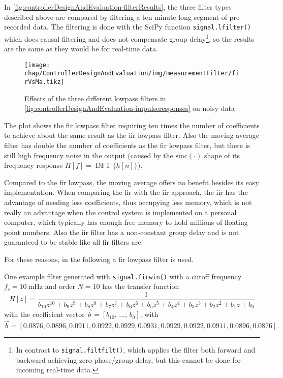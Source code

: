 In \autoref{fig:controllerDesignAndEvaluation-filterResults}, the three filter types described above are compared by filtering a ten minute long segment of pre-recorded data. The filtering is done with the SciPy function \texttt{signal.lfilter()} which does causal filtering and does not compensate group delay\footnote{In contrast to \texttt{signal.filtfilt()}, which applies the filter both forward and backward achieving zero phase/group delay, but this cannot be done for incoming real-time data.}, so the results are the same as they would be for real-time data.

\begin{figure}[tb]
	\centering
	\texttt{[image: chap/ControllerDesignAndEvaluation/img/measurementFilter/firVsMa.tikz]}
	\caption{Effects of the three different lowpass filters in \autoref{fig:controllerDesignAndEvaluation-impulseresponses} on noisy data}
	\label{fig:controllerDesignAndEvaluation-filterResults}
\end{figure}

The plot shows the \gls{fir} lowpass filter requiring ten times the number of coefficients to achieve about the same result as the \gls{iir} lowpass filter.
Also the moving average filter has double the number of coefficients as the \gls{fir} lowpass filter, but there is still high frequency noise in the output (caused by the $\text{sinc}(\cdot)$ shape of its frequency response $H[f]=\operatorname{DFT}\{h[n]\}$).

Compared to the \gls{fir} lowpass, the moving average offers no benefit besides its easy implementation.
When comparing the \gls{fir} with the \gls{iir} approach, the \gls{iir} has the advantage of needing less coefficients, thus occupying less memory, which is not really an advantage when the control system is implemented on a personal computer, which typically has enough free memory to hold millions of floating point numbers.
Also the \gls{iir} filter has a non-constant group delay and is not guaranteed to be stable like all \gls{fir} filters are.

For these reasons, in the following a \gls{fir} lowpass filter is used.

One example filter generated with \texttt{signal.firwin()} with a cutoff frequency $f_c=\SI{10}{\milli\hertz}$ and order $N=10$ has the transfer function
\begin{equation}
H[z]=\frac{1}{b_{10} z^{10} + b_{9} z^9 + b_{8} z^8 + b_{7} z^7 + b_{6} z^6 + b_{5} z^5 + b_{4} z^4 + b_{3} z^3  + b_{2} z^2 + b_{1} z + b_{0}}
\end{equation}
with the coefficient vector $\vec{b}=[b_{10},\,...,\,b_0]$, with
\begin{equation}
\vec{b}=[0.0876,0.0896,0.0911,0.0922,0.0929,0.0931,0.0929,0.0922,0.0911,0.0896,0.0876].
\end{equation}

